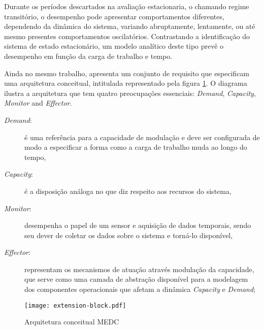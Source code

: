 Durante os períodos descartados na avaliação estacionaria, o chamando regime transitório, o desempenho pode apresentar comportamentos diferentes, dependendo da dinâmica do sistema, variando abruptamente, lentamente, ou até mesmo presentes comportamentos oscilatórios. Contrastando a identificação do sistema de estado estacionário, um modelo analítico deste tipo prevê o desempenho em função da carga de trabalho e tempo.

Ainda no mesmo trabalho,  apresenta um conjunto de requisito que especificam uma arquitetura conceitual, intitulada \textit{} representado pela figura \ref{fig:extension-block}. O diagrama ilustra a arquitetura que tem quatro preocupações essenciais: \textit{Demand}, \textit{Capacity}, \textit{Monitor} and \textit{Effector}.

\begin{description}
	\item[\textit{Demand}:] é uma referência para a capacidade de modulação e deve ser configurada de modo a especificar a forma como a carga de trabalho muda ao longo do tempo,
	\item[\textit{Capacity}:]  é a disposição análoga no que diz respeito aos recursos do sistema,
	\item[\textit{Monitor}:] desempenha o papel de um sensor e aquisição de dados temporais, sendo seu dever de coletar os dados sobre o sistema e torná-lo disponível,
	\item[\textit{Effector}:] representam os mecanismos de atuação através modulação da capacidade, que serve como uma camada de abstração disponível para a modelagem dos componentes operacionais que afetam a dinâmica \textit{Capacity} e \textit{Demand};
\end{description}

\begin{figure}[!htb]
	\centering
	\texttt{[image: extension-block.pdf]}
	\caption{Arquitetura conceitual MEDC}
	\label{fig:extension-block}
\end{figure}

